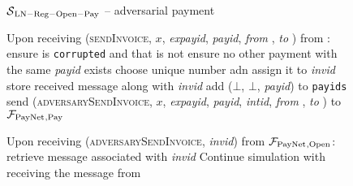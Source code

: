 \begin{figure}[!htbp]
  \begin{simulatorbox}{$\mathcal{S}{}_{\mathrm{LN - Reg - Open - Pay}}$ --
  adversarial payment}
    \begin{algorithmic}[1]
      \State Upon receiving (\textsc{sendInvoice}, $x$, \textit{expayid},
      \textit{payid}, \textit{from} \alice, \textit{to} \bob) from \adversary:
      \Indent
      \label{alg:sim:pay:adv:invoice}
        \State ensure \alice{} is \texttt{corrupted} and that \bob{} is not
        \State ensure no other payment with the same \textit{payid} exists
        \State choose unique number adn assign it to \textit{invid}
        \State store received message along with \textit{invid}
        \State add ($\bot$, $\bot$, \textit{payid}) to \texttt{payids}
        \State send (\textsc{adversarySendInvoice}, $x$, \textit{expayid},
        \textit{payid}, \textit{intid}, \textit{from} \alice, \textit{to} \bob)
        to $\mathcal{F}_{\mathrm{PayNet}}{}_{\mathrm{, Pay}}$
        \label{alg:sim:pay:adv:invoice:send}
      \EndIndent
      \Statex

      \State Upon receiving (\textsc{adversarySendInvoice}, \textit{invid}) from
      $\mathcal{F}_{\mathrm{PayNet}}{}_{\mathrm{, Open}}$:
      \label{alg:sim:pay:adv:invoice:recv}
      \Indent
        \State retrieve message associated with \textit{invid}
        \State Continue simulation with \alice{} receiving the message from \bob
        \label{alg:sim:pay:adv:invoice:cont}
      \EndIndent
    \end{algorithmic}
  \end{simulatorbox}
  \caption{}
  \label{alg:sim:pay:adv}
\end{figure}

